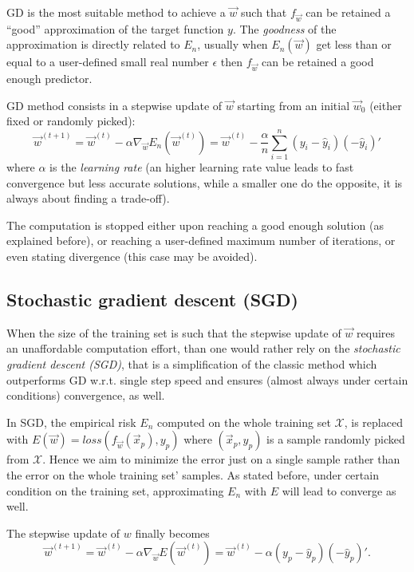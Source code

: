 \documentclass[a4paper,12pt]{article}
\theoremstyle{newplanestyle}
\theoremstyle{newdefinitionstyle}
\theoremstyle{newprovestyle}
\begin{document}
GD is the most suitable method to achieve a $\vec{w}$ such that $f_{\vec{w}}$ can be retained a ``good'' approximation of the target function $y$. The \textit{goodness} of the approximation is directly related to $E_n$, usually when $E_n(\vec{w})$ get less than or equal to a user-defined small real number $\epsilon$ then $f_{\vec{w}}$ can be retained a good enough predictor.

GD method consists in a stepwise update of $\vec{w}$ starting from an initial $\vec{w}_0$ (either fixed or randomly picked):
\begin{equation*}
\vec{w}^{(t+1)} = \vec{w}^{(t)}-\alpha \nabla_{\vec{w}} E_n(\vec{w}^{(t)})
= \vec{w}^{(t)} - \frac{\alpha}{n} \sum_{i=1}^{n}(y_i - \hat{y}_i)(-\hat{y}_i)'
\end{equation*}
where $\alpha$ is the \textit{learning rate} (an higher learning rate value leads to fast convergence but less accurate solutions, while a smaller one do the opposite, it is always about finding a trade-off).

The computation is stopped either upon reaching a good enough solution (as explained before), or reaching a user-defined maximum number of iterations, or even stating divergence (this case may be avoided).

\subsection*{Stochastic gradient descent (SGD)}
When the size of the training set is such that the stepwise update of $\vec{w}$ requires an unaffordable computation effort, than one would rather rely on the \textit{stochastic gradient descent (SGD)}, that is a simplification of the classic method which outperforms GD w.r.t. single step speed and ensures (almost always under certain conditions) convergence, as well.

In SGD, the empirical risk $E_n$ computed on the whole training set $\mathcal{X}$, is replaced with $E(\vec{w})=loss(f_{\vec{w}}(\vec{x}_p),y_p)$ where $(\vec{x}_p, y_p)$ is a sample randomly picked from $\mathcal{X}$. Hence we aim to minimize the error just on a single sample rather than the error on the whole training set' samples. As stated before, under certain condition on the training set, approximating $E_n$ with $E$ will lead to converge as well.

The stepwise update of $w$ finally becomes
\[
\vec{w}^{(t+1)}=\vec{w}^{(t)}-\alpha \nabla_{\vec{w}} E(\vec{w}^{(t)})=\vec{w}^{(t)}-\alpha (y_p - \hat{y}_p)(-\hat{y}_p)'.
\]
\end{document}
